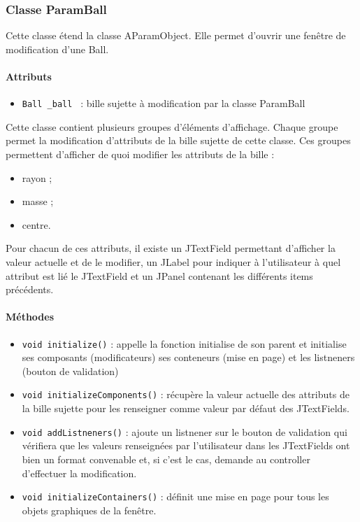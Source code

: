 \documentclass{report}
\begin{document}
\subsubsection{Classe ParamBall}

Cette classe étend la classe AParamObject. Elle permet d'ouvrir une fenêtre de modification d'une Ball.

\paragraph*{Attributs}
\begin{itemize}
\item \texttt{Ball \_ball } : bille sujette à modification par la classe ParamBall
\end{itemize}
Cette classe contient plusieurs groupes d'éléments d'affichage. Chaque groupe permet la modification d'attributs de la bille sujette de cette classe. Ces groupes permettent d'afficher de quoi modifier les attributs de la bille :
\begin{itemize}
\item rayon ;
\item masse ;
\item centre.
\end{itemize}
Pour chacun de ces attributs, il existe un JTextField permettant d'afficher la valeur actuelle et de le modifier, un JLabel pour indiquer à l'utilisateur à quel attribut est lié le JTextField et un JPanel contenant les différents items précédents.

\paragraph*{Méthodes}
\begin{itemize}
\item \texttt{void initialize()} : appelle la fonction initialise de son parent et initialise ses composants (modificateurs) ses conteneurs (mise en page) et les listneners (bouton de validation)
\item \texttt{void initializeComponents()} : récupère la valeur actuelle des attributs de la bille sujette pour les renseigner comme valeur par défaut des JTextFields.
\item \texttt{void addListneners()} : ajoute un listnener sur le bouton de validation qui vérifiera que les valeurs renseignées par l'utilisateur dans les JTextFields ont bien un format convenable et, si c'est le cas, demande au controller d'effectuer la modification.
\item \texttt{void initializeContainers()} : définit une mise en page pour tous les objets graphiques de la fenêtre.
\end{itemize}
\end{document}
